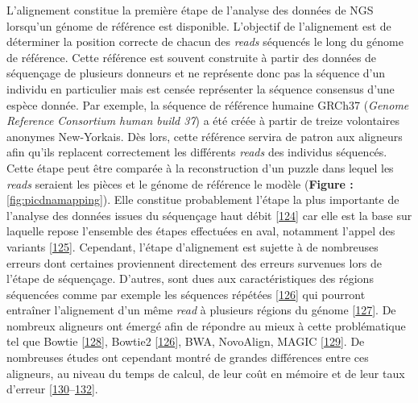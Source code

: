 \documentclass[12pt,twoside]{ugathesis}
\theoremstyle{definition}
\theoremstyle{definition}
\theoremstyle{remark}
\begin{document}
L'alignement constitue la première étape de l'analyse des données de NGS
lorsqu'un génome de référence est disponible. L'objectif de l'alignement
est de déterminer la position correcte de chacun des \emph{reads}
séquencés le long du génome de référence. Cette référence est souvent
construite à partir des données de séquençage de plusieurs donneurs et
ne représente donc pas la séquence d'un individu en particulier mais est
censée représenter la séquence consensus d'une espèce donnée. Par
exemple, la séquence de référence humaine GRCh37 (\emph{Genome Reference
Consortium human build 37}) a été créée à partir de treize volontaires
anonymes New-Yorkais. Dès lors, cette référence servira de patron aux
aligneurs afin qu'ils replacent correctement les différents \emph{reads}
des individus séquencés. Cette étape peut être comparée à la
reconstruction d'un puzzle dans lequel les \emph{reads} seraient les
pièces et le génome de référence le modèle (\textbf{Figure :
}\ref{fig:picdnamapping}). Elle constitue probablement l'étape la plus
importante de l'analyse des données issues du séquençage haut débit
{[}\protect\hyperlink{ref-Flicek2009}{124}{]} car elle est la base sur
laquelle repose l'ensemble des étapes effectuées en aval, notamment
l'appel des variants {[}\protect\hyperlink{ref-Nielsen2011}{125}{]}.
Cependant, l'étape d'alignement est sujette à de nombreuses erreurs dont
certaines proviennent directement des erreurs survenues lors de l'étape
de séquençage. D'autres, sont dues aux caractéristiques des régions
séquencées comme par exemple les séquences répétées
{[}\protect\hyperlink{ref-Langmead2012}{126}{]} qui pourront entraîner
l'alignement d'un même \emph{read} à plusieurs régions du génome
{[}\protect\hyperlink{ref-Treangen2013}{127}{]}. De nombreux aligneurs
ont émergé afin de répondre au mieux à cette problématique tel que
Bowtie {[}\protect\hyperlink{ref-Langmead2009}{128}{]}, Bowtie2
{[}\protect\hyperlink{ref-Langmead2012}{126}{]}, BWA, NovoAlign, MAGIC
{[}\protect\hyperlink{ref-Su2014}{129}{]}. De nombreuses études ont
cependant montré de grandes différences entre ces aligneurs, au niveau
du temps de calcul, de leur coût en mémoire et de leur taux d'erreur
{[}\protect\hyperlink{ref-Ruffalo2011}{130}--\protect\hyperlink{ref-Bao2011}{132}{]}.

\newpage
\end{document}
